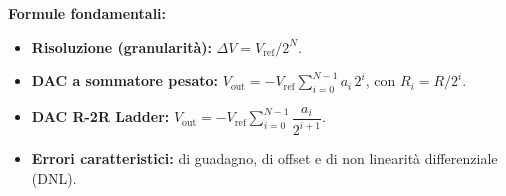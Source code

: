\begin{note}
\textbf{Formule fondamentali:}
\begin{itemize}
    \item \textbf{Risoluzione (granularità):} $\Delta V = V_{\text{ref}}/2^N$.
    \item \textbf{DAC a sommatore pesato:} $V_{\text{out}} = -V_{\text{ref}} \sum_{i=0}^{N-1} a_i\, 2^i$, con $R_i = R/2^i$.
    \item \textbf{DAC R-2R Ladder:} $V_{\text{out}} = -V_{\text{ref}} \sum_{i=0}^{N-1} \dfrac{a_i}{2^{i+1}}$.
    \item \textbf{Errori caratteristici:} di guadagno, di offset e di non linearità differenziale (DNL).
\end{itemize}
\end{note}

